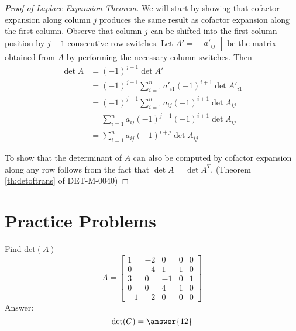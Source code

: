 \documentclass{ximera}
\begin{document}
\begin{proof}[Proof of Laplace Expansion Theorem]
We will start by showing that cofactor expansion along column $j$ produces the same result as cofactor expansion along the first column.  Observe that column $j$ can be shifted into the first column position by $j-1$ consecutive row switches.  Let $A'=\begin{bmatrix}a'_{ij}\end{bmatrix}$ be the matrix obtained from $A$ by performing the necessary column switches.  Then 
\begin{align*}
\det{A}&=(-1)^{j-1}\det{A'}\\
&=(-1)^{j-1}\sum_{i=1}^na'_{i1}(-1)^{i+1}\det{A'_{i1}}\\
&=(-1)^{j-1}\sum_{i=1}^na_{ij}(-1)^{i+1}\det{A_{ij}}\\
&=\sum_{i=1}^na_{ij}(-1)^{j-1}(-1)^{i+1}\det{A_{ij}}\\
&=\sum_{i=1}^na_{ij}(-1)^{i+j}\det{A_{ij}}
\end{align*}

To show that the determinant of $A$ can also be computed by cofactor expansion along any row follows from the fact that $\det{A}=\det{A^T}$. (Theorem \ref{th:detoftrans} of DET-M-0040)
\end{proof}
\section*{Practice Problems}

\begin{problem}
Find $\text{det}(A)$
  $$A=\begin{bmatrix}1&-2&0&0&0\\0&-4&1&1&0\\3&0&-1&0&1\\0&0&4&1&0\\-1&-2&0&0&0\end{bmatrix}$$
  Answer:
  $$\text{det}(C)=\answer{12}$$
\end{problem}
\end{document}
